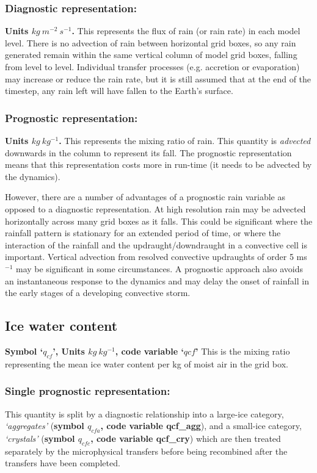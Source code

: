 \documentclass{UMDP_article}
\begin{document}
\subsubsection{Diagnostic representation:}
\textbf{Units $kg~m^{-2}~s^{-1}$.} This represents the flux of rain (or rain rate)
in each model level. There is no advection of rain between horizontal grid boxes,
so any rain generated remain within the same vertical column of model grid boxes,
falling from level to level. Individual transfer processes (e.g. accretion or 
evaporation) may increase or reduce the rain rate, but it is still assumed that
at the end of the timestep, any rain left will have fallen to the Earth's
surface. 

\subsubsection{Prognostic representation:}
\textbf{Units $kg~kg^{-1}$.}
This represents the mixing ratio of rain.
This quantity is \textit{advected} downwards in the column to represent its fall.
The prognostic representation means that this representation costs more in 
run-time (it needs to be advected by the dynamics).

However, there are a number of advantages of a prognostic rain variable as 
opposed to a diagnostic representation. At high resolution rain may be 
advected horizontally across many grid boxes as it falls. This could be 
significant where the rainfall pattern is stationary for an extended period 
of time, or where the interaction of the rainfall and the 
updraught/downdraught in a convective cell is important. Vertical advection 
from resolved convective updraughts of order 5 ms$^{-1}$ may be significant in some
circumstances. A prognostic approach also avoids an instantaneous response to 
the dynamics and may delay the onset of rainfall in the early stages of a 
developing convective storm. 

\subsection{Ice water content}
\textbf{Symbol `$q_{cf}$', Units $kg~kg^{-1}$, code variable `$qcf$'}
This is the mixing ratio representing the mean ice 
water content per kg of moist air in the grid box.

\subsubsection{Single prognostic representation:}
This quantity is split by a diagnostic relationship into a large-ice category, 
\textit{`aggregates'} (\textbf{symbol $q_{cfa}$, code variable qcf\_agg}), and
a small-ice category, \textit{`crystals'} 
(\textbf{symbol $q_{cfc}$, code variable qcf\_cry}) which are then treated 
separately by the microphysical transfers before being recombined after the 
transfers have been completed.
\end{document}
